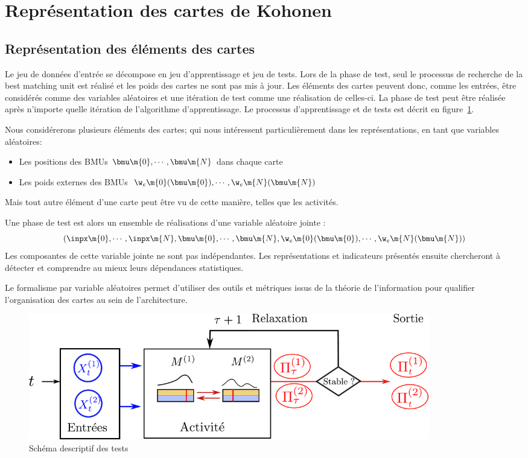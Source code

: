 \section{Représentation des cartes de Kohonen}

\subsection{Représentation des éléments des cartes}

Le jeu de données d'entrée se décompose en jeu d'apprentissage et jeu de tests. Lors de la phase de test, seul le processus de recherche de la best matching unit est réalisé et les poids des cartes ne sont pas mis à jour. Les éléments des cartes peuvent donc, comme les entrées, être considérés comme des variables aléatoires et une itération de test comme une réalisation de celles-ci. La phase de test peut être réalisée après n'importe quelle itération de l'algorithme d'apprentissage. Le processus d'apprentissage et de tests est décrit en figure~\ref{fig:flowchart}.

Nous considérerons plusieurs éléments des cartes; qui nous intéressent particulièrement dans les représentations, en tant que variables aléatoires: 
\begin{itemize}
\item Les positions des BMUs $\bmu\m{0}, \cdots, \bmu\m{N}$ dans chaque carte
\item Les poids externes des BMUs $\w_e\m{0}(\bmu\m{0}), \cdots, \w_e\m{N}(\bmu\m{N})$
\end{itemize}
Mais tout autre élément d'une carte peut être vu de cette manière, telles que les activités.


Une phase de test est alors un ensemble de réalisations d'une variable aléatoire jointe : 
$$(\inpx\m{0}, \cdots, \inpx\m{N}, \bmu\m{0}, \cdots, \bmu\m{N}, \w_e\m{0}(\bmu\m{0}), \cdots, \w_e\m{N}(\bmu\m{N}))$$
Les composantes de cette variable jointe ne sont pas indépendantes. Les représentations et indicateurs présentés ensuite chercheront à détecter et comprendre au mieux leurs dépendances statistiques.

Le formalisme par variable aléatoires permet d'utiliser des outils et métriques issus de la théorie de l'information pour qualifier l'organisation des cartes au sein de l'architecture.

\begin{figure}
\centering
\includegraphics[width=0.85\textwidth]{tests_2maps.pdf}
\caption{Schéma descriptif des tests}
\label{fig:flowchart}
\end{figure}


